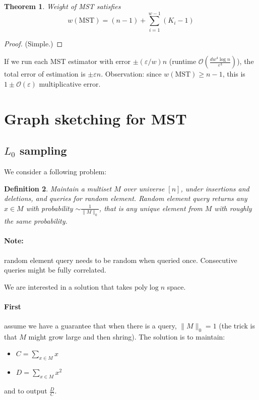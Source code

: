 \documentclass[11pt]{article}
\newtheorem{theorem}{Theorem}
\newtheorem{definition}[theorem]{Definition}
\newcommand{\bigo}{\mathcal{O}}
\begin{document}
\begin{theorem}
Weight of MST satisfies
$$w(\text{MST}) = (n-1) + \sum_{i=1}^{w-1} (K_i - 1)$$
\end{theorem}
\begin{proof} (Simple.)
\end{proof}


If we run each MST estimator with error $\pm (\varepsilon/w)n$ (runtime $\bigo(\frac{d w^4 \log n}{\varepsilon^3})$), the total error of estimation is $\pm \varepsilon n$. Observation: since $w(\text{MST}) \ge n-1$, this is $1\pm \bigo(\varepsilon)$ multiplicative error.


\section{Graph sketching for MST \cite{DBLP:conf/pods/AhnGM12}}
\subsection{$L_0$ sampling}
We consider a following problem:
\begin{definition}
Maintain a multiset $M$ over universe $[n]$, under insertions and deletions, and queries for random element. Random element query returns any $x \in M$ with probability $\sim \frac{1}{\|M\|_0}$, that is any unique element from $M$ with roughly the same probability.
\end{definition}

\paragraph{Note:} random element query needs to be random when queried once. Consecutive queries might be fully correlated.

We are interested in a solution that takes $\text{poly} \log n$ space.

\paragraph{First} assume we have a guarantee that when there is a query, $\|M\|_0 = 1$ (the trick is that $M$ might grow large and then shring). The solution is to maintain:
\begin{itemize}
\item $C = \sum_{x \in M} x$
\item $D = \sum_{x \in M} x^2$
\end{itemize}
and to output $\frac{D}{C}$.
\end{document}
